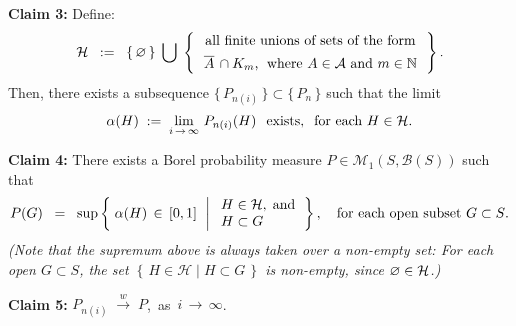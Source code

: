 \vskip 0.5cm
\begin{center}
\begin{minipage}{6.5in}
\textbf{Claim 3:}\quad
Define:
\begin{equation*}
\mathcal{H}
\;\; := \;\;
\left\{\,\varemptyset\,\right\}
\;\bigcup\;
\left\{\,
\begin{array}{c}
\textnormal{all finite unions of sets of the form}
\\
\textnormal{$\overline{A}\,\overset{{\color{white}1}}{\cap}K_{m}$, \;where $A \in \mathcal{A}$ and $m \in \N$}
\end{array}
\,\right\}.
\end{equation*}
Then, there exists a subsequence $\{\,P_{n(i)}\,\} \subset \{\,P_{n}\,\}$ such that the limit
\begin{equation*}
\alpha(H) \; := \;
\lim_{i\,\rightarrow\,\infty}\,P_{n(i)}(H) \;\;\,\textnormal{exists},
\;\;
\textnormal{for each $H \in \mathcal{H}$}.
\end{equation*}
\end{minipage}
\end{center}

\vskip 0.5cm
\begin{center}
\begin{minipage}{6.5in}
\textbf{Claim 4:}\quad
There exists a Borel probability measure $P \in \mathcal{M}_{1}(S,\mathcal{B}(S))$ such that
\begin{equation*}
P(G)
\;\; = \;\;
\sup\left\{\;
\alpha(H) \,\in\, [0,1]
\,\;\left\vert\;
\begin{array}{l} H \in \mathcal{H}, \;\textnormal{and} \\ H \subset G \end{array}
\right.
\right\},
\quad
\textnormal{for each open subset $G \subset S$}.
\end{equation*}
\textit{\small(Note that the supremum above is always taken over a non-empty set: For each open $G \subset S$,
the set $\left\{\,H \in \mathcal{H}\;\vert\;H \subset G\,\right\}$ is non-empty, since $\varnothing \in \mathcal{H}$.)}
\end{minipage}
\end{center}

\vskip 0.5cm
\begin{center}
\begin{minipage}{6.5in}
\textbf{Claim 5:}\quad
$P_{n(i)} \;\overset{w}{\longrightarrow}\; P$,\,
as \,$i\,\longrightarrow\,\infty$.
\end{minipage}
\end{center}

